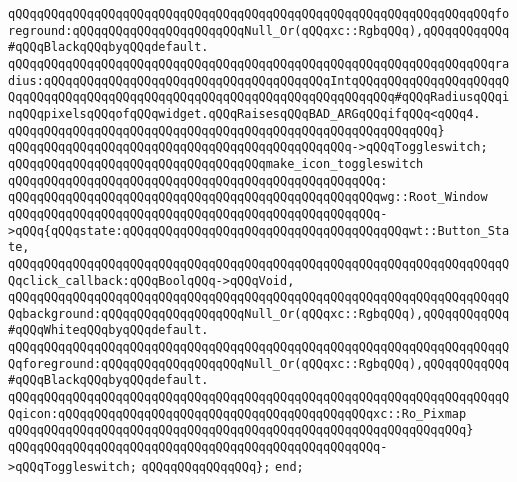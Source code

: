 \verb|qQQqqQQqqQQqqQQqqQQqqQQqqQQqqQQqqQQqqQQqqQQqqQQqqQQqqQQqqQQqqQQqqQQqforeground:qQQqqQQqqQQqqQQqqQQqqQQqNull_Or(qQQqxc::RgbqQQq),qQQqqQQqqQQq#qQQqBlackqQQqbyqQQqdefault.|\newline
\verb|qQQqqQQqqQQqqQQqqQQqqQQqqQQqqQQqqQQqqQQqqQQqqQQqqQQqqQQqqQQqqQQqqQQqradius:qQQqqQQqqQQqqQQqqQQqqQQqqQQqqQQqqQQqqQQqIntqQQqqQQqqQQqqQQqqQQqqQQqqQQqqQQqqQQqqQQqqQQqqQQqqQQqqQQqqQQqqQQqqQQqqQQqqQQq#qQQqRadiusqQQqinqQQqpixelsqQQqofqQQqwidget.qQQqRaisesqQQqBAD_ARGqQQqifqQQq<qQQq4.|\newline
\verb|qQQqqQQqqQQqqQQqqQQqqQQqqQQqqQQqqQQqqQQqqQQqqQQqqQQqqQQqqQQq}|\newline
\verb|qQQqqQQqqQQqqQQqqQQqqQQqqQQqqQQqqQQqqQQqqQQqqQQq->qQQqToggleswitch;|\newline
\newline
\verb|qQQqqQQqqQQqqQQqqQQqqQQqqQQqqQQqqQQqmake_icon_toggleswitch|\newline
\verb|qQQqqQQqqQQqqQQqqQQqqQQqqQQqqQQqqQQqqQQqqQQqqQQqqQQq:|\newline
\verb|qQQqqQQqqQQqqQQqqQQqqQQqqQQqqQQqqQQqqQQqqQQqqQQqqQQqwg::Root_Window|\newline
\verb|qQQqqQQqqQQqqQQqqQQqqQQqqQQqqQQqqQQqqQQqqQQqqQQqqQQq->qQQq{qQQqstate:qQQqqQQqqQQqqQQqqQQqqQQqqQQqqQQqqQQqqQQqwt::Button_State,|\newline
\verb|qQQqqQQqqQQqqQQqqQQqqQQqqQQqqQQqqQQqqQQqqQQqqQQqqQQqqQQqqQQqqQQqqQQqqQQqclick_callback:qQQqBoolqQQq->qQQqVoid,|\newline
\verb|qQQqqQQqqQQqqQQqqQQqqQQqqQQqqQQqqQQqqQQqqQQqqQQqqQQqqQQqqQQqqQQqqQQqqQQqbackground:qQQqqQQqqQQqqQQqqQQqNull_Or(qQQqxc::RgbqQQq),qQQqqQQqqQQq#qQQqWhiteqQQqbyqQQqdefault.|\newline
\verb|qQQqqQQqqQQqqQQqqQQqqQQqqQQqqQQqqQQqqQQqqQQqqQQqqQQqqQQqqQQqqQQqqQQqqQQqforeground:qQQqqQQqqQQqqQQqqQQqNull_Or(qQQqxc::RgbqQQq),qQQqqQQqqQQq#qQQqBlackqQQqbyqQQqdefault.|\newline
\verb|qQQqqQQqqQQqqQQqqQQqqQQqqQQqqQQqqQQqqQQqqQQqqQQqqQQqqQQqqQQqqQQqqQQqqQQqicon:qQQqqQQqqQQqqQQqqQQqqQQqqQQqqQQqqQQqqQQqqQQqxc::Ro_Pixmap|\newline
\verb|qQQqqQQqqQQqqQQqqQQqqQQqqQQqqQQqqQQqqQQqqQQqqQQqqQQqqQQqqQQqqQQq}|\newline
\verb|qQQqqQQqqQQqqQQqqQQqqQQqqQQqqQQqqQQqqQQqqQQqqQQqqQQq->qQQqToggleswitch;|\newline
\newline
\verb|qQQqqQQqqQQqqQQq};|\newline
\newline
\verb|end;|\newline
\newline

